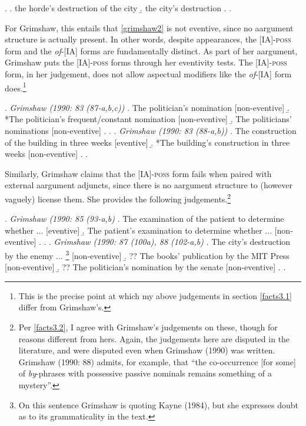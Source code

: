 \documentclass[12pt]{article}
\begin{document}
\singlespacing

\ex. 
\a. \label{grimshaw1} the horde's destruction of the city
\b. \label{grimshaw2} the city's destruction
\z. \z. \par

\doublespacing

\noindent For Grimshaw, this entails that \ref{grimshaw2} is not eventive, since no aargument structure is actually present. In other words, despite appearances, the [IA]-\textsc{poss} form and the \textit{of}-[IA] forms are fundamentally distinct. As part of her aargument, Grimshaw puts the [IA]-\textsc{poss} forms through her eventivity tests. The [IA]-\textsc{poss} form, in her judgement, does not allow aspectual modifiers like the \textit{of}-[IA] form does.\footnote{ This is the precise point at which my above judgements in section \ref{facts3.1} differ from Grimshaw's.}

\singlespacing

\ex. \textit{Grimshaw (1990: 83 (87-a,b,c))}
\a. The politician's nomination \hfill [non-eventive]
\b. *The politician's frequent/constant nomination \hfill [non-eventive]
\b. The politicians' nominations \hfill [non-eventive]
\z. \z.
\ex. \textit{Grimshaw (1990: 83 (88-a,b))}
\a. The construction of the building in three weeks \hfill [eventive]
\b. *The building's construction in three weeks \hfill [non-eventive]
\z. \z. \par

\doublespacing

Similarly, Grimshaw claims that the [IA]-\textsc{poss} form fails when paired with external aargument adjuncts, since there is no aargument structure to (however vaguely) license them. She provides the following judgements.\footnote{ Per \ref{facts3.2}, I agree with Grimshaw's judgements on these, though for reasons different from hers. Again, the judgements here are disputed in the literature, and were disputed even when Grimshaw (1990) was written. Grimshaw (1990: 88) admits, for example, that ``the co-occurrence [for some] of \textit{by}-phrases with possessive passive nominals remains something of a mystery''.}

\singlespacing

\ex. \textit{Grimshaw (1990: 85 (93-a,b)}
\a. The examination of the patient to determine whether ... \hfill [eventive]
\b. The patient's examination to determine whether ... \hfill [non-eventive]
\z. \z.
\ex. \textit{Grimshaw (1990: 87 (100a), 88 (102-a,b)}
\a. The city's destruction by the enemy ... \footnote{ On this sentence Grimshaw is quoting Kayne (1984), but she expresses doubt as to its grammaticality in the text.} \hfill [non-eventive]
\b. ?? The books' publication by the MIT Press \hfill [non-eventive]
\b. ?? The politician's nomination by the senate \hfill [non-eventive]
\z. \z. \par
\end{document}
